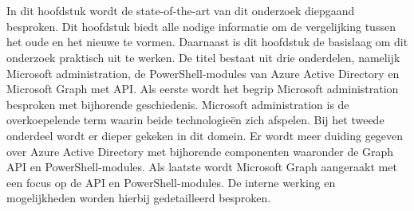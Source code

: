 \chapter{}%
\label{ch:stand-van-zaken}



\begin{comment}

Dit hoofdstuk bevat je literatuurstudie. De inhoud gaat verder op de inleiding, maar zal het onderwerp van de bachelorproef *diepgaand* uitspitten. De bedoeling is dat de lezer na lezing van dit hoofdstuk helemaal op de hoogte is van de huidige stand van zaken (state-of-the-art) in het onderzoeksdomein. Iemand die niet vertrouwd is met het onderwerp, weet nu voldoende om de rest van het verhaal te kunnen volgen, zonder dat die er nog andere informatie moet over opzoeken \autocite{Pollefliet2011}.

Je verwijst bij elke bewering die je doet, vakterm die je introduceert, enz.\ naar je bronnen. In \LaTeX{} kan dat met het commando \texttt{$\backslash${textcite\{\}}} of \texttt{$\backslash${autocite\{\}}}. Als argument van het commando geef je de ``sleutel'' van een ``record'' in een bibliografische databank in het Bib\LaTeX{}-formaat (een tekstbestand). Als je expliciet naar de auteur verwijst in de zin, gebruik je \texttt{$\backslash${}textcite\{\}}.
Soms wil je de auteur niet expliciet vernoemen, dan gebruik je \texttt{$\backslash${}autocite\{\}}. In de volgende paragraaf een voorbeeld van elk.

\textcite{Knuth1998} schreef een van de standaardwerken over sorteer- en zoekalgoritmen. Experten zijn het erover eens dat cloud computing een interessante opportuniteit vormen, zowel voor gebruikers als voor dienstverleners op vlak van informatietechnologie~\autocite{Creeger2009}.

\end{comment}

In dit hoofdstuk wordt de state-of-the-art van dit onderzoek diepgaand besproken. Dit hoofdstuk biedt alle nodige informatie om de vergelijking tussen het oude en het nieuwe te vormen. Daarnaast is dit hoofdstuk de basislaag om dit onderzoek praktisch uit te werken. De titel bestaat uit drie onderdelen, namelijk Microsoft administration, de PowerShell-modules van Azure Active Directory en Microsoft Graph met \ac{API}. Als eerste wordt het begrip Microsoft administration besproken met bijhorende geschiedenis. Microsoft administration is de overkoepelende term waarin beide technologieën zich afspelen. Bij het tweede onderdeel wordt er dieper gekeken in dit domein. Er wordt meer duiding gegeven over Azure Active Directory met bijhorende componenten waaronder de Graph \Ac{API} en PowerShell-modules. Als laatste wordt Microsoft Graph aangeraakt met een focus op de \ac{API} en PowerShell-modules. De interne werking en mogelijkheden worden hierbij gedetailleerd besproken.


